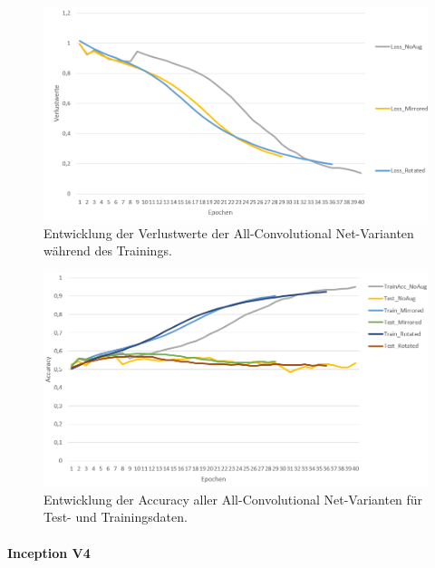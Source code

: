 \begin{figure}[H]
\centering
\includegraphics[scale=0.5]{pictures/Auswertung/all_conv_loss}
\caption{Entwicklung der Verlustwerte der All-Convolutional Net-Varianten während des Trainings.}
\label{fig:loss_allconv}
\end{figure}
\begin{figure}[H]
\centering
\includegraphics[scale=0.5]{pictures/Auswertung/all_conv_acc_}
\caption{Entwicklung der Accuracy aller All-Convolutional Net-Varianten für Test- und Trainingsdaten.}
\label{fig:acc_allconv}
\end{figure}

\paragraph{Inception V4}

